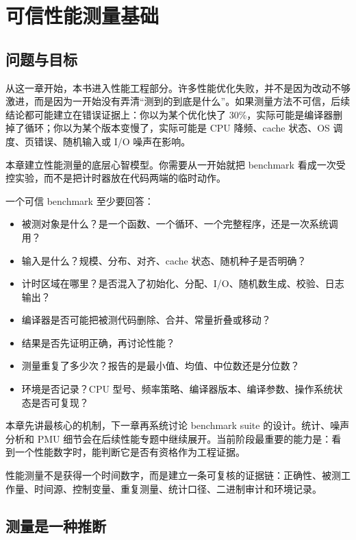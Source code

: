 \chapter{可信性能测量基础}

\section{问题与目标}

从这一章开始，本书进入性能工程部分。许多性能优化失败，并不是因为改动不够激进，而是因为一开始没有弄清“测到的到底是什么”。如果测量方法不可信，后续结论都可能建立在错误证据上：你以为某个优化快了 30\%，实际可能是编译器删掉了循环；你以为某个版本变慢了，实际可能是 CPU 降频、cache 状态、OS 调度、页错误、随机输入或 I/O 噪声在影响。

本章建立性能测量的底层心智模型。你需要从一开始就把 benchmark 看成一次受控实验，而不是把计时器放在代码两端的临时动作。

一个可信 benchmark 至少要回答：

\begin{itemize}
  \item 被测对象是什么？是一个函数、一个循环、一个完整程序，还是一次系统调用？
  \item 输入是什么？规模、分布、对齐、cache 状态、随机种子是否明确？
  \item 计时区域在哪里？是否混入了初始化、分配、I/O、随机数生成、校验、日志输出？
  \item 编译器是否可能把被测代码删除、合并、常量折叠或移动？
  \item 结果是否先证明正确，再讨论性能？
  \item 测量重复了多少次？报告的是最小值、均值、中位数还是分位数？
  \item 环境是否记录？CPU 型号、频率策略、编译器版本、编译参数、操作系统状态是否可复现？
\end{itemize}

本章先讲最核心的机制，下一章再系统讨论 benchmark suite 的设计。统计、噪声分析和 PMU 细节会在后续性能专题中继续展开。当前阶段最重要的能力是：看到一个性能数字时，能判断它是否有资格作为工程证据。

\begin{keyidea}
性能测量不是获得一个时间数字，而是建立一条可复核的证据链：正确性、被测工作量、时间源、控制变量、重复测量、统计口径、二进制审计和环境记录。
\end{keyidea}

\section{测量是一种推断}

